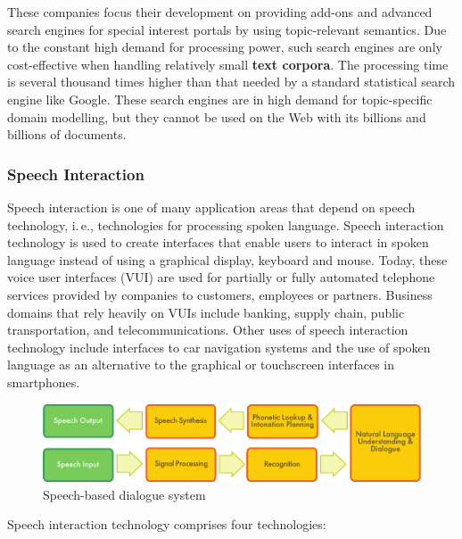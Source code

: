 \begin{multicols}{2}
These companies focus their development on providing add-ons and advanced search engines for special interest portals by using topic-relevant semantics. Due to the constant high demand for processing power, such search engines are only cost-effective when handling relatively small \textbf{text corpora}. The processing time is several thousand times higher than that needed by a standard statistical search engine like Google. These search engines are in high demand for topic-specific domain modelling, but they cannot be used on the Web with its billions and billions of documents.



\subsubsection{Speech Interaction}

Speech interaction is one of many application areas that depend on speech technology, i.\,e., technologies for processing spoken language. Speech interaction technology is used to create interfaces that enable users to interact in spoken language instead of using a graphical display, keyboard and mouse.  Today, these voice user interfaces (VUI) are used for partially or fully automated telephone services provided by companies to customers, employees or partners. Business domains that rely heavily on VUIs include banking, supply chain, public transportation, and telecommunications. Other uses of speech interaction technology include interfaces to car navigation systems and the use of spoken language as an alternative to the graphical or touchscreen interfaces in smartphones.

\begin{figure}[htb]
  \center
  \includegraphics[width=\textwidth]{../_media/english/simple_speech-based_dialogue_architecture}
  \caption{Speech-based dialogue system}
  \label{fig:dialoguearch_en}
\end{figure}

Speech interaction technology comprises four technologies:


\end{multicols}

